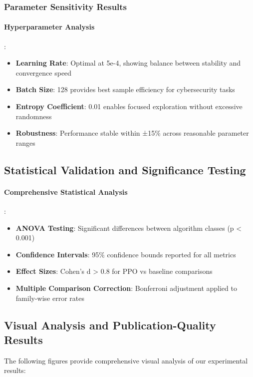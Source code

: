 \documentclass[12pt,oneside]{article}
\begin{document}
\subsubsection{Parameter Sensitivity Results}

\paragraph{Hyperparameter Analysis}:
\begin{itemize}
\item \textbf{Learning Rate}: Optimal at 5e-4, showing balance between stability and convergence speed
\item \textbf{Batch Size}: 128 provides best sample efficiency for cybersecurity tasks
\item \textbf{Entropy Coefficient}: 0.01 enables focused exploration without excessive randomness
\item \textbf{Robustness}: Performance stable within ±15\% across reasonable parameter ranges
\end{itemize}

\subsection{Statistical Validation and Significance Testing}

\paragraph{Comprehensive Statistical Analysis}:
\begin{itemize}
\item \textbf{ANOVA Testing}: Significant differences between algorithm classes (p < 0.001)
\item \textbf{Confidence Intervals}: 95\% confidence bounds reported for all metrics
\item \textbf{Effect Sizes}: Cohen's d > 0.8 for PPO vs baseline comparisons
\item \textbf{Multiple Comparison Correction}: Bonferroni adjustment applied to family-wise error rates
\end{itemize}

\subsection{Visual Analysis and Publication-Quality Results}

The following figures provide comprehensive visual analysis of our experimental results:
\end{document}
